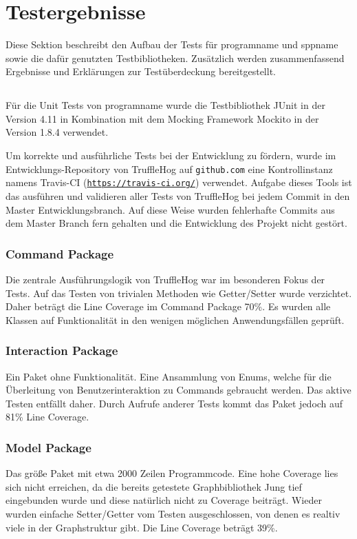 \chapter{Testergebnisse}

Diese Sektion beschreibt den Aufbau der Tests für \gls{programname} und \gls{sppname} sowie die dafür genutzten Testbibliotheken. Zusätzlich werden zusammenfassend Ergebnisse und Erklärungen zur Testüberdeckung bereitgestellt.

\section{\programname}

Für die Unit Tests von \gls{programname} wurde die Testbibliothek JUnit in der Version 4.11 in Kombination mit dem Mocking Framework Mockito in der Version 1.8.4 verwendet.

Um korrekte und ausführliche Tests bei der Entwicklung zu fördern, wurde im Entwicklungs-Repository von TruffleHog auf \texttt{github.com} eine Kontrollinstanz namens Travis-CI \newline (\hyperlink{https://travis-ci.org/}{\texttt{https://travis-ci.org/}}) verwendet. Aufgabe dieses Tools ist das ausführen und validieren aller Tests von TruffleHog bei jedem Commit in den Master Entwicklungsbranch. Auf diese Weise wurden fehlerhafte Commits aus dem Master Branch fern gehalten und die Entwicklung des Projekt nicht gestört.

\subsection{Command Package}

Die zentrale Ausführungslogik von TruffleHog war im besonderen Fokus der Tests. Auf das Testen von trivialen Methoden wie Getter/Setter wurde verzichtet. Daher beträgt die Line Coverage im Command Package  70\%. Es wurden alle Klassen auf Funktionalität in den wenigen möglichen Anwendungsfällen geprüft.

\subsection{Interaction Package}
Ein Paket ohne Funktionalität. Eine Ansammlung von Enums, welche für die Überleitung von Benutzerinteraktion zu Commands gebraucht werden. Das aktive Testen entfällt daher. Durch Aufrufe anderer Tests kommt das Paket jedoch auf 81\% Line Coverage.

\subsection{Model Package}
Das größe Paket mit etwa 2000 Zeilen Programmcode. Eine hohe Coverage lies sich nicht erreichen, da die bereits getestete Graphbibliothek Jung tief eingebunden wurde und diese natürlich nicht zu Coverage beiträgt. Wieder wurden einfache Setter/Getter vom Testen ausgeschlossen, von denen es realtiv viele in der Graphstruktur gibt. Die Line Coverage beträgt 39\%.

